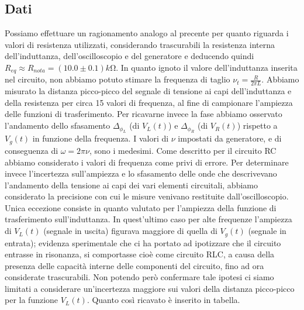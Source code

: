 \documentclass[a4paper]{article}
\begin{document}
\subsection{Dati}
Possiamo effettuare un ragionamento analogo al precente per quanto riguarda i valori di resistenza utilizzati, considerando trascurabili la resistenza interna dell'induttanza, dell'oscilloscopio e del generatore e deducendo quindi $R_{eq}\approx R_{nota} = (10.0\pm 0.1) k\si{\ohm}$. In quanto ignoto il valore dell'induttanza inserita nel circuito, non abbiamo potuto stimare la frequenza di taglio $\nu_t = \frac{R}{2\pi L}$. Abbiamo misurato la distanza picco-picco del segnale di tensione ai capi dell'induttanza e della resistenza per circa 15 valori di frequenza, al fine di campionare l'ampiezza delle funzioni di trasferimento. Per ricavarne invece la fase abbiamo osservato l'andamento dello sfasamento $\Delta_{\phi_L}$ (di $V_L (t)$) e $\Delta_{\phi_R}$ (di $V_R (t)$) rispetto a $V_g (t)$ in funzione della frequenza. I valori di $\nu$ impostati da generatore, e di conseguenza di $\omega= 2\pi \nu$, sono i medesimi. Come descritto per il circuito RC abbiamo considerato i valori di frequenza come privi di errore. Per determinare invece l'incertezza sull'ampiezza e lo sfasamento delle onde che descrivevano l'andamento della tensione ai capi dei vari elementi circuitali, abbiamo considerato la precisione con cui le misure venivano restituite dall'oscilloscopio. Unica eccezione consiste in quanto valutato per l'ampiezza della funzione di trasferimento sull'induttanza. In quest'ultimo caso per alte frequenze l'ampiezza di $V_L(t)$ (segnale in uscita) figurava maggiore di quella di $V_g(t)$ (segnale in entrata); evidenza sperimentale che ci ha portato ad ipotizzare che il circuito entrasse in risonanza, si comportasse cioè come circuito RLC, a causa della presenza delle capacità interne delle componenti del circuito, fino ad ora considerate trascurabili. Non potendo però confermare tale ipotesi ci siamo limitati a considerare un'incertezza maggiore sui valori della distanza picco-picco per la funzione $V_L(t)$. Quanto così ricavato è inserito in tabella.
\end{document}
